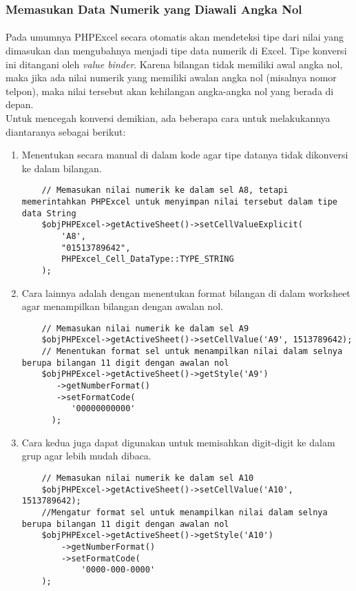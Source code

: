 \subsubsection{Memasukan Data Numerik yang Diawali Angka Nol}
\paragraph{} Pada umumnya PHPExcel secara otomatis akan mendeteksi tipe dari nilai yang dimasukan dan mengubahnya menjadi tipe data numerik di Excel. Tipe konversi ini ditangani oleh \textit{value binder}. Karena bilangan tidak memiliki awal angka nol, maka jika ada nilai numerik yang memiliki awalan angka nol (misalnya nomor telpon), maka nilai tersebut akan kehilangan angka-angka nol yang berada di depan.\\
Untuk mencegah konversi demikian, ada beberapa cara untuk melakukannya diantaranya sebagai berikut:
\begin{enumerate}
	\item Menentukan secara manual di dalam kode agar tipe datanya tidak dikonversi ke dalam bilangan.
	\begin{lstlisting}
	// Memasukan nilai numerik ke dalam sel A8, tetapi memerintahkan PHPExcel untuk menyimpan nilai tersebut dalam tipe data String
	$objPHPExcel->getActiveSheet()->setCellValueExplicit(
	    'A8', 
	    "01513789642",
	    PHPExcel_Cell_DataType::TYPE_STRING
	);
	\end{lstlisting}
	\item Cara lainnya adalah dengan menentukan format bilangan di dalam worksheet agar menampilkan bilangan dengan awalan nol.
	\begin{lstlisting}
	// Memasukan nilai numerik ke dalam sel A9
	$objPHPExcel->getActiveSheet()->setCellValue('A9', 1513789642);
	// Menentukan format sel untuk menampilkan nilai dalam selnya berupa bilangan 11 digit dengan awalan nol
	$objPHPExcel->getActiveSheet()->getStyle('A9')
 	   ->getNumberFormat()
 	   ->setFormatCode(
  	      '00000000000'
  	  );
	\end{lstlisting}
	\item Cara kedua juga dapat digunakan untuk memisahkan digit-digit ke dalam grup agar lebih mudah dibaca.
	\begin{lstlisting}
	// Memasukan nilai numerik ke dalam sel A10
	$objPHPExcel->getActiveSheet()->setCellValue('A10', 1513789642);
	//Mengatur format sel untuk menampilkan nilai dalam selnya berupa bilangan 11 digit dengan awalan nol
	$objPHPExcel->getActiveSheet()->getStyle('A10')
    	->getNumberFormat()
    	->setFormatCode(
        	'0000-000-0000'
    );
	\end{lstlisting}
\end{enumerate}
